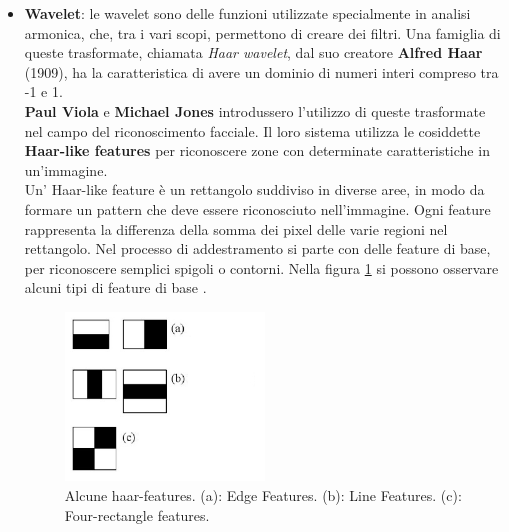 \begin{itemize}
\item \textbf{Wavelet}: le wavelet sono delle funzioni utilizzate specialmente in analisi armonica, che, tra i vari scopi, permettono di creare dei filtri. Una famiglia di queste trasformate, chiamata \textit{Haar wavelet}, dal suo creatore \textbf{Alfred  Haar} (1909)\cite{haar-wavelet}, ha la caratteristica di avere un dominio di numeri interi compreso tra -1 e 1.\\
\textbf{Paul Viola} e \textbf{Michael Jones} \cite{viola-jones} introdussero l'utilizzo di queste trasformate nel campo del riconoscimento facciale. Il loro sistema utilizza le cosiddette \textbf{Haar-like features} per riconoscere zone con determinate caratteristiche in un'immagine\cite{haar-features}.\\
Un' Haar-like feature è un rettangolo suddiviso in diverse aree, in modo da formare un pattern che deve essere riconosciuto nell'immagine. Ogni feature rappresenta la differenza della somma dei pixel delle varie regioni nel rettangolo. Nel processo di addestramento si parte con delle feature di base, per riconoscere semplici spigoli o contorni. Nella figura \ref{features} si possono osservare alcuni tipi di feature di base \cite{opencvTut2}.\\
\begin{figure}[htbp]
\centering
\includegraphics[width=0.5\textwidth]{images/openCV/haar_features2.jpg}
\caption{Alcune haar-features.
			(a): Edge Features.
			(b): Line Features.
			(c): Four-rectangle features.\label{features}}
\end{figure}


\end{itemize}
